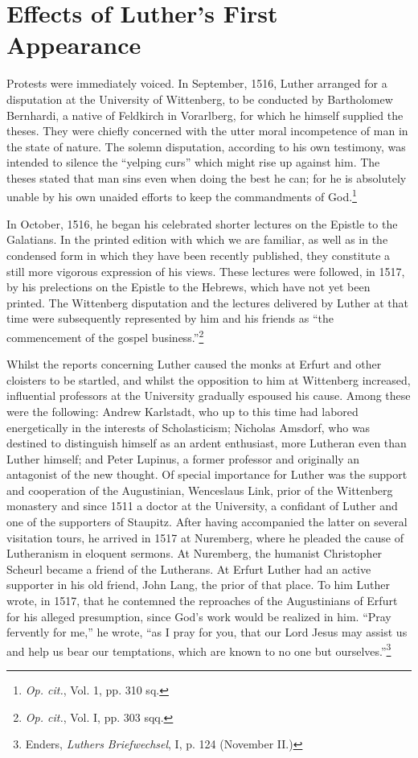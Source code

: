 \section{Effects of Luther’s First Appearance}

Protests were immediately voiced. In September, 1516, Luther
arranged for a disputation at the University of Wittenberg, to be
conducted by Bartholomew Bernhardi, a native of Feldkirch in
Vorarlberg, for which he himself supplied the theses. They were
chiefly concerned with the utter moral incompetence of man in the
state of nature. The solemn disputation, according to his own testimony,
was intended to silence the “yelping curs” which might rise up against him.
The theses stated that man sins even when doing the best he can;
for he is absolutely unable by his own unaided efforts to keep the commandments of God.\footnote
{\textit{Op. cit.}, Vol. 1, pp. 310 sq.}

In October, 1516, he began his celebrated shorter lectures on the
Epistle to the Galatians. In the printed edition with which we are
familiar, as well as in the condensed form in which they have been
recently published, they constitute a still more vigorous expression of
his views. These lectures were followed, in 1517, by his prelections on
the Epistle to the Hebrews, which have not yet been printed. The
Wittenberg disputation and the lectures delivered by Luther at that
time were subsequently represented by him and his friends as “the
commencement of the gospel business.”\footnote{\textit{Op. cit.}, Vol. I, pp. 303 sqq.}

Whilst the reports concerning Luther caused the monks at Erfurt
and other cloisters to be startled, and whilst the opposition to him
at Wittenberg increased, influential professors at the University
gradually espoused his cause. Among these were the following:
Andrew Karlstadt, who up to this time had labored energetically in
the interests of Scholasticism; Nicholas Amsdorf, who was destined
to distinguish himself as an ardent enthusiast, more Lutheran even
than Luther himself; and Peter Lupinus, a former professor and
originally an antagonist of the new thought. Of special importance
for Luther was the support and cooperation of the Augustinian,
Wenceslaus Link, prior of the Wittenberg monastery and since 1511
a doctor at the University, a confidant of Luther and one of the
supporters of Staupitz. After having accompanied the latter on several
visitation tours, he arrived in 1517 at Nuremberg, where he pleaded
the cause of Lutheranism in eloquent sermons. At Nuremberg, the
humanist Christopher Scheurl became a friend of the Lutherans.
At Erfurt Luther had an active supporter in his old friend, John
Lang, the prior of that place. To him Luther wrote, in 1517, that he
contemned the reproaches of the Augustinians of Erfurt for his alleged
presumption, since God’s work would be realized in him. “Pray
fervently for me,” he wrote, “as I pray for you, that our Lord Jesus
may assist us and help us bear our temptations, which are known
to no one but ourselves.”\footnote{Enders, \textit{Luthers Briefwechsel}, I, p. 124 (November II.)}

